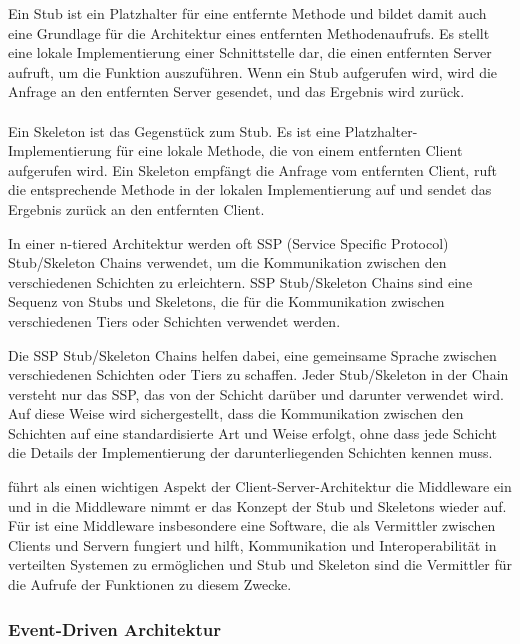 \begin{itemize}
Ein Stub ist ein Platzhalter für eine entfernte Methode und bildet damit auch eine Grundlage für die Architektur eines entfernten Methodenaufrufs. Es stellt eine lokale Implementierung einer Schnittstelle dar, die einen entfernten Server aufruft, um die Funktion auszuführen. Wenn ein Stub aufgerufen wird, wird die Anfrage an den entfernten Server gesendet, und das Ergebnis wird zurück.
\\\\
Ein Skeleton ist das Gegenstück zum Stub. Es ist eine Platzhalter-Implementierung für eine lokale Methode, die von einem entfernten Client aufgerufen wird. Ein Skeleton empfängt die Anfrage vom entfernten Client, ruft die entsprechende Methode in der lokalen Implementierung auf und sendet das Ergebnis zurück an den entfernten Client.

In einer n-tiered Architektur werden oft SSP (Service Specific Protocol) Stub/Skeleton Chains verwendet, um die Kommunikation zwischen den verschiedenen Schichten zu erleichtern. SSP Stub/Skeleton Chains sind eine Sequenz von Stubs und Skeletons, die für die Kommunikation zwischen verschiedenen Tiers oder Schichten verwendet werden.

Die SSP Stub/Skeleton Chains helfen dabei, eine gemeinsame Sprache zwischen verschiedenen Schichten oder Tiers zu schaffen. Jeder Stub/Skeleton in der Chain versteht nur das SSP, das von der Schicht darüber und darunter verwendet wird. Auf diese Weise wird sichergestellt, dass die Kommunikation zwischen den Schichten auf eine standardisierte Art und Weise erfolgt, ohne dass jede Schicht die Details der Implementierung der darunterliegenden Schichten kennen muss.
\end{itemize}

\cite{tanenbaum2017distributed} führt als einen wichtigen Aspekt der Client-Server-Architektur die Middleware ein und in die Middleware nimmt er das Konzept der Stub und Skeletons wieder auf. Für \cite{tanenbaum2017distributed} ist eine Middleware insbesondere eine Software, die als Vermittler zwischen Clients und Servern fungiert und hilft, Kommunikation und Interoperabilität in verteilten Systemen zu ermöglichen und Stub und Skeleton sind die Vermittler für die Aufrufe der Funktionen zu diesem Zwecke.
              
\subsubsection{Event-Driven Architektur}

